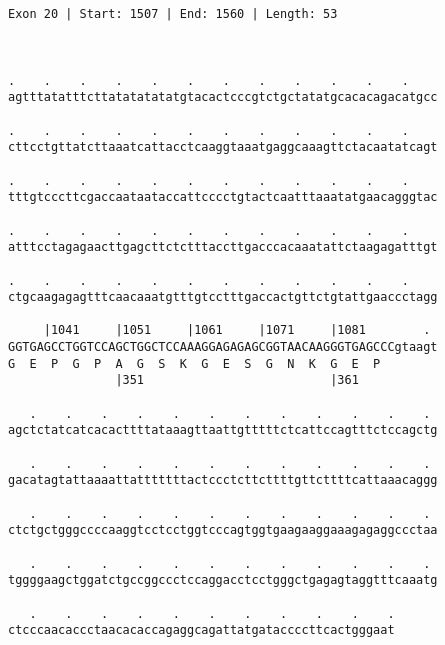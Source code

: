 \documentclass{article}
\begin{document}
\begin{Verbatim}
Exon 20 | Start: 1507 | End: 1560 | Length: 53



.    .    .    .    .    .    .    .    .    .    .    .    
agtttatatttcttatatatatatgtacactcccgtctgctatatgcacacagacatgcc
                                                            
.    .    .    .    .    .    .    .    .    .    .    .    
cttcctgttatcttaaatcattacctcaaggtaaatgaggcaaagttctacaatatcagt
                                                            
.    .    .    .    .    .    .    .    .    .    .    .    
tttgtcccttcgaccaataataccattcccctgtactcaatttaaatatgaacagggtac
                                                            
.    .    .    .    .    .    .    .    .    .    .    .    
atttcctagagaacttgagcttctctttaccttgacccacaaatattctaagagatttgt
                                                            
.    .    .    .    .    .    .    .    .    .    .    .    
ctgcaagagagtttcaacaaatgtttgtcctttgaccactgttctgtattgaaccctagg
                                                            
     |1041     |1051     |1061     |1071     |1081        . 
GGTGAGCCTGGTCCAGCTGGCTCCAAAGGAGAGAGCGGTAACAAGGGTGAGCCCgtaagt
G  E  P  G  P  A  G  S  K  G  E  S  G  N  K  G  E  P        
               |351                          |361           
  
   .    .    .    .    .    .    .    .    .    .    .    . 
agctctatcatcacacttttataaagttaattgtttttctcattccagtttctccagctg
                                                            
   .    .    .    .    .    .    .    .    .    .    .    . 
gacatagtattaaaattatttttttactccctcttcttttgttcttttcattaaacaggg
                                                            
   .    .    .    .    .    .    .    .    .    .    .    . 
ctctgctgggccccaaggtcctcctggtcccagtggtgaagaaggaaagagaggccctaa
                                                            
   .    .    .    .    .    .    .    .    .    .    .    . 
tggggaagctggatctgccggccctccaggacctcctgggctgagagtaggtttcaaatg
                                                            
   .    .    .    .    .    .    .    .    .    .    .
ctcccaacaccctaacacaccagaggcagattatgataccccttcactgggaat
                                                      

\end{Verbatim}
\end{document}
